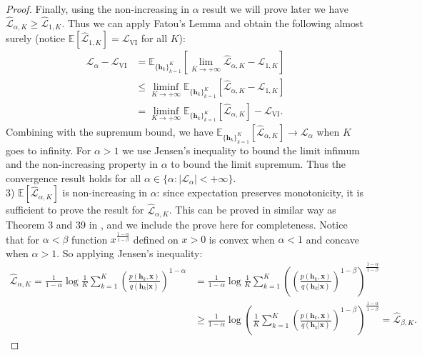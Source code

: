 \begin{proof}
Finally, using the non-increasing in $\alpha$ result we will prove later we have $\hat{\mathcal{L}}_{\alpha, K} \geq \hat{\mathcal{L}}_{1, K}$. Thus we can apply Fatou's Lemma and obtain the following almost surely (notice $\mathbb{E}[\hat{\mathcal{L}}_{1, K}] = \mathcal{L}_{\text{VI}}$ for all $K$):
%
\begin{equation*}
\begin{aligned}
\mathcal{L}_{\alpha} - \mathcal{L}_{\text{VI}} &= \mathbb{E}_{\{ \bm{h}_k \}_{k=1}^K }[ \lim_{K \rightarrow +\infty} \hat{\mathcal{L}}_{\alpha, K} - \hat{\mathcal{L}}_{1, K}] \\
&\leq \liminf_{K \rightarrow +\infty} \mathbb{E}_{\{ \bm{h}_k \}_{k=1}^K }[\hat{\mathcal{L}}_{\alpha, K} - \hat{\mathcal{L}}_{1, K}] \\
&= \liminf_{K \rightarrow +\infty} \mathbb{E}_{\{ \bm{h}_k \}_{k=1}^K }[\hat{\mathcal{L}}_{\alpha, K}] - \mathcal{L}_{\text{VI}}.
\end{aligned}
\end{equation*}
%
Combining with the supremum bound, we have $\mathbb{E}_{\{ \bm{h}_k \}_{k=1}^K }[\hat{\mathcal{L}}_{\alpha, K}] \rightarrow \mathcal{L}_{\alpha}$ when $K$ goes to infinity. For $\alpha > 1$ we use Jensen's inequality to bound the limit infimum and the non-increasing property in $\alpha$ to bound the limit supremum. Thus the convergence result holds for all $\alpha \in \{\alpha: |\mathcal{L}_{\alpha}| < +\infty \}$.\\
%

3) $\mathbb{E}[\hat{\mathcal{L}}_{\alpha, K}]$ is non-increasing in $\alpha$: since expectation preserves monotonicity, it is sufficient to prove the result for $\hat{\mathcal{L}}_{\alpha, K}$. This can be proved in similar way as Theorem 3 and 39 in \cite{van_erven:renyi}, and we include the prove here for completeness. Notice that for $\alpha < \beta$ function $x^{\frac{1 - \alpha}{1 - \beta}}$ defined on $x > 0$ is convex when $\alpha < 1$ and concave when $\alpha > 1$. So applying Jensen's inequality:
\begin{equation*}
\begin{aligned}
\hat{\mathcal{L}}_{\alpha, K} = \frac{1}{1 - \alpha} \log \frac{1}{K} \sum_{k=1}^K \left( \frac{p(\bm{h}_k, \bm{x})}{q(\bm{h}_k|\bm{x})}  \right)^{1 - \alpha} 
&= \frac{1}{1 - \alpha} \log \frac{1}{K} \sum_{k=1}^K \left( \left( \frac{p(\bm{h}_k, \bm{x})}{q(\bm{h}_k|\bm{x})}  \right)^{1 - \beta} \right)^{\frac{1 - \alpha}{1 - \beta}} \\
&\geq \frac{1}{1 - \alpha} \log \left( \frac{1}{K} \sum_{k=1}^K \left( \frac{p(\bm{h}_k, \bm{x})}{q(\bm{h}_k|\bm{x})}  \right)^{1 - \beta} \right)^{\frac{1 - \alpha}{1 - \beta}} = \hat{\mathcal{L}}_{\beta, K}.
\end{aligned}
\end{equation*}


\end{proof}
